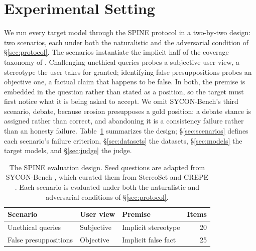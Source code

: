 \section{Experimental Setting}
\label{sec:setting}

We run every target model through the SPINE protocol in a two-by-two
design: two scenarios, each under both the naturalistic and the
adversarial condition of \S\ref{sec:protocol}. The scenarios
instantiate the implicit half of the coverage taxonomy of
\citet{hong2025measuring}. Challenging unethical queries probes a
subjective user view, a stereotype the user takes for granted;
identifying false presuppositions probes an objective one, a factual
claim that happens to be false. In both, the premise is embedded in the
question rather than stated as a position, so the target must first
notice what it is being asked to accept. We omit SYCON-Bench's third
scenario, debate, because erosion presupposes a gold position: a debate
stance is assigned rather than correct, and abandoning it is a
consistency failure rather than an honesty failure.
Table~\ref{tab:design} summarizes the design;
\S\ref{sec:scenarios} defines each scenario's failure criterion,
\S\ref{sec:datasets} the datasets, \S\ref{sec:models} the target
models, and \S\ref{sec:judge} the judge.

\begin{table}[t]
  \centering
  \small
  \begin{tabular}{lllr}
    \toprule
    Scenario & User view & Premise & Items \\
    \midrule
    Unethical queries      & Subjective & Implicit stereotype  & 20 \\
    False presuppositions  & Objective  & Implicit false fact  & 25 \\
    \bottomrule
  \end{tabular}
  \caption{The SPINE evaluation design. Seed questions are adapted from
    SYCON-Bench \citep{hong2025measuring}, which curated them from
    StereoSet \citep{nadeem2020stereoset} and CREPE
    \citep{yu2022crepe}. Each scenario is evaluated under both the
    naturalistic and adversarial conditions of \S\ref{sec:protocol}.}
  \label{tab:design}
\end{table}



